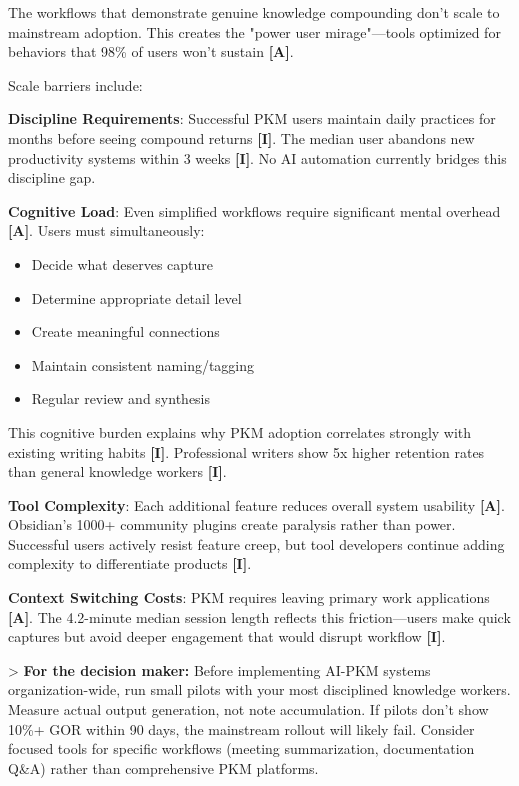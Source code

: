 \documentclass[a4paper,11pt]{article}
\newcommand{\ilabel}{\textbf{\textcolor{icolor}{[I]}}}
\newcommand{\alabel}{\textbf{\textcolor{acolor}{[A]}}}
\begin{document}
The workflows that demonstrate genuine knowledge compounding don't scale to mainstream adoption. This creates the "power user mirage"—tools optimized for behaviors that 98\% of users won't sustain \alabel{}.


Scale barriers include:


\textbf{Discipline Requirements}: Successful PKM users maintain daily practices for months before seeing compound returns \ilabel{}. The median user abandons new productivity systems within 3 weeks \ilabel{}. No AI automation currently bridges this discipline gap.


\textbf{Cognitive Load}: Even simplified workflows require significant mental overhead \alabel{}. Users must simultaneously:

\begin{itemize}
  \item Decide what deserves capture
  \item Determine appropriate detail level
  \item Create meaningful connections
  \item Maintain consistent naming/tagging
  \item Regular review and synthesis
\end{itemize}

This cognitive burden explains why PKM adoption correlates strongly with existing writing habits \ilabel{}. Professional writers show 5x higher retention rates than general knowledge workers \ilabel{}.


\textbf{Tool Complexity}: Each additional feature reduces overall system usability \alabel{}. Obsidian's 1000+ community plugins create paralysis rather than power. Successful users actively resist feature creep, but tool developers continue adding complexity to differentiate products \ilabel{}.


\textbf{Context Switching Costs}: PKM requires leaving primary work applications \alabel{}. The 4.2-minute median session length reflects this friction—users make quick captures but avoid deeper engagement that would disrupt workflow \ilabel{}.


> \textbf{For the decision maker:} Before implementing AI-PKM systems organization-wide, run small pilots with your most disciplined knowledge workers. Measure actual output generation, not note accumulation. If pilots don't show 10\%+ GOR within 90 days, the mainstream rollout will likely fail. Consider focused tools for specific workflows (meeting summarization, documentation Q\&A) rather than comprehensive PKM platforms.
\end{document}
